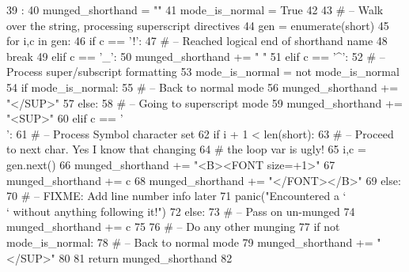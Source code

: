 \begin{DoxyCode}
39                           :
40     munged_shorthand = ""
41     mode_is_normal = True
42 
43     # -- Walk over the string, processing superscript directives
44     gen = enumerate(short)
45     for i,c in gen:
46         if c == '!':
47             # -- Reached logical end of shorthand name
48             break
49         elif c == '_':
50             munged_shorthand += " "
51         elif c == '^':
52             # -- Process super/subscript formatting
53             mode_is_normal = not mode_is_normal
54             if mode_is_normal:
55                 # -- Back to normal mode
56                 munged_shorthand += "</SUP>"
57             else:
58                 # -- Going to superscript mode
59                 munged_shorthand += "<SUP>"
60         elif c == '\\':
61             # -- Process Symbol character set
62             if i + 1 < len(short):
63                 # -- Proceed to next char. Yes I know that changing
64                 # the loop var is ugly!
65                 i,c = gen.next()
66                 munged_shorthand += "<B><FONT size=+1>"
67                 munged_shorthand += c
68                 munged_shorthand += "</FONT></B>"
69             else:
70                 # -- FIXME: Add line number info later
71                 panic("Encountered a `\\` without anything following it!")
72         else:
73             # -- Pass on un-munged
74             munged_shorthand += c
75 
76     # -- Do any other munging
77     if not mode_is_normal:
78         # -- Back to normal mode
79         munged_shorthand += "</SUP>"
80 
81     return munged_shorthand
82 

\end{DoxyCode}
